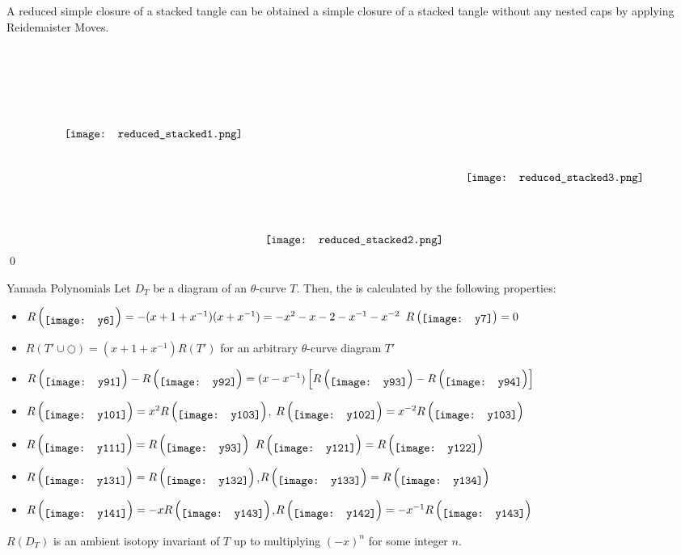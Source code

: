 \begin{frame}
	\begin{prop}
		A reduced simple closure of a stacked tangle
		can be obtained a simple closure of a stacked tangle without any nested caps by applying Reidemaister Moves.
	\end{prop}
	\mypf
	\vspace*{-12pt}
	$$\raisebox{-.13\textheight}{\texttt{[image: reduced\_stacked1.png]}}\qquad\raisebox{-.3\textheight}{\texttt{[image: reduced\_stacked2.png]}}\qquad\raisebox{-.2\textheight}{\texttt{[image: reduced\_stacked3.png]}}$$
	\hfill\qed
\end{frame}


\begin{frame}{Yamada Polynomials}
	Let $D_T$ be a diagram of an $\theta$-curve $T$.
	Then, the  is calculated by the following properties:
	\begin{itemize}
		\item {} $R\left(\raisebox{-3pt}{\texttt{[image: y6]}}\right)= - (x+1+x^{-1})(x + x^{-1}) = -x^2 - x - 2 - x^{-1} - x^{-2}$\hfill {} $R\left(\raisebox{-1.5pt}{\texttt{[image: y7]}}\right)=0$
		\item {} $R(T'\cup\bigcirc) = (x+1+x^{-1})R(T')$ for an arbitrary $\theta$-curve diagram $T'$
		\item {} $R\left(\raisebox{-3pt}{\texttt{[image: y91]}}\right)-R\left(\raisebox{-3pt}{\texttt{[image: y92]}}\right)=(x-x^{-1})\left[R\left(\raisebox{-3pt}{\texttt{[image: y93]}}\right)-R\left(\raisebox{-3pt}{\texttt{[image: y94]}}\right)\right]$
		\item {} $R\left(\raisebox{-3pt}{\texttt{[image: y101]}}\right) = x^2 R\left(\raisebox{-3pt}{\texttt{[image: y103]}}\right)$,\quad
		$R\left(\raisebox{-3pt}{\texttt{[image: y102]}}\right) = x^{-2} R\left(\raisebox{-3pt}{\texttt{[image: y103]}}\right)$
		\item {} $R\left(\raisebox{-3pt}{\texttt{[image: y111]}}\right) = R\left(\raisebox{-3pt}{\texttt{[image: y93]}}\right)$\hfill
		 $R\left(\raisebox{-3pt}{\texttt{[image: y121]}}\right) = R\left(\raisebox{-3pt}{\texttt{[image: y122]}}\right)$
		\item {} $R\left(\raisebox{-3pt}{\texttt{[image: y131]}}\right) = R\left(\raisebox{-3pt}{\texttt{[image: y132]}}\right)$,\quad $R\left(\raisebox{-3pt}{\texttt{[image: y133]}}\right) = R\left(\raisebox{-3pt}{\texttt{[image: y134]}}\right)$
		\item {} $R\left(\raisebox{-3pt}{\texttt{[image: y141]}}\right) = -x R\left(\raisebox{-3pt}{\texttt{[image: y143]}}\right)$,\quad $R\left(\raisebox{-3pt}{\texttt{[image: y142]}}\right) = -x^{-1}R\left(\raisebox{-3pt}{\texttt{[image: y143]}}\right)$
	\end{itemize}

	\begin{prop}
		$R(D_T)$ is an ambient isotopy invariant of $T$ up to multiplying $(-x)^n$ for some integer $n$.
	\end{prop}
\end{frame}


